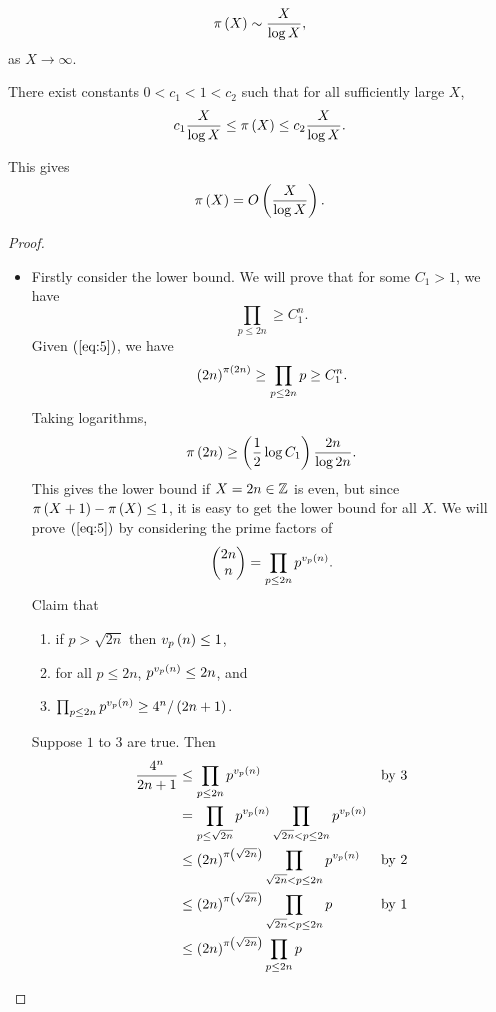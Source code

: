 \begin{theorem}
$$ \pi\left( X \right) \sim \dfrac{X}{\log X}, $$
as $ X \to \infty $.
\end{theorem}

\begin{theorem}
There exist constants $ 0 < c_1 < 1 < c_2 $ such that for all sufficiently large $ X $,
$$ c_1\dfrac{X}{\log X} \le \pi\left( X \right) \le c_2\dfrac{X}{\log X}. $$
\end{theorem}

This gives
$$ \pi\left( X \right) = O\left( \dfrac{X}{\log X} \right). $$


\begin{proof}
\hfill
\begin{itemize}
\item Firstly consider the lower bound. We will prove that for some $ C_1 > 1 $, we have
\begin{equation}
\label{eq:5}
\prod_{p \le 2n} \ge C_1^n.
\end{equation}
Given $ \left( \ref{eq:5} \right) $, we have
$$ \left( 2n \right)^{\pi\left( 2n \right)} \ge \prod_{p \le 2n} p \ge C_1^n. $$
Taking logarithms,
$$ \pi\left( 2n \right) \ge \left( \dfrac{1}{2}\log C_1 \right)\dfrac{2n}{\log 2n}. $$
This gives the lower bound if $ X = 2n \in \mathbb{Z} $ is even, but since $ \pi\left( X + 1 \right) - \pi\left( X \right) \le 1 $, it is easy to get the lower bound for all $ X $. We will prove $ \left( \ref{eq:5} \right) $ by considering the prime factors of
$$ \begin{pmatrix} 2n \\ n \end{pmatrix} = \prod_{p \le 2n} p^{v_p\left( n \right)}. $$
Claim that
\begin{enumerate}
\item if $ p > \sqrt{2n} $ then $ v_p\left( n \right) \le 1 $,
\item for all $ p \le 2n $, $ p^{v_p\left( n \right)} \le 2n $, and
\item $ \prod_{p \le 2n} p^{v_p\left( n \right)} \ge 4^n / \left( 2n + 1 \right) $.
\end{enumerate}
Suppose $ 1 $ to $ 3 $ are true. Then
\begin{align*}
\dfrac{4^n}{2n + 1}
& \le \prod_{p \le 2n} p^{v_p\rb{n}} & \text{by } 3 \\
& = \prod_{p \le \sqrt{2n}} p^{v_p\rb{n}} \prod_{\sqrt{2n} < p \le 2n} p^{v_p\rb{n}} \\
& \le \rb{2n}^{\pi\rb{\sqrt{2n}}} \prod_{\sqrt{2n} < p \le 2n} p^{v_p\rb{n}} & \text{by } 2 \\
& \le \rb{2n}^{\pi\rb{\sqrt{2n}}} \prod_{\sqrt{2n} < p \le 2n} p & \text{by } 1 \\
& \le \rb{2n}^{\pi\rb{\sqrt{2n}}} \prod_{p \le 2n} p \\

\end{align*}
\end{itemize}
\end{proof}
